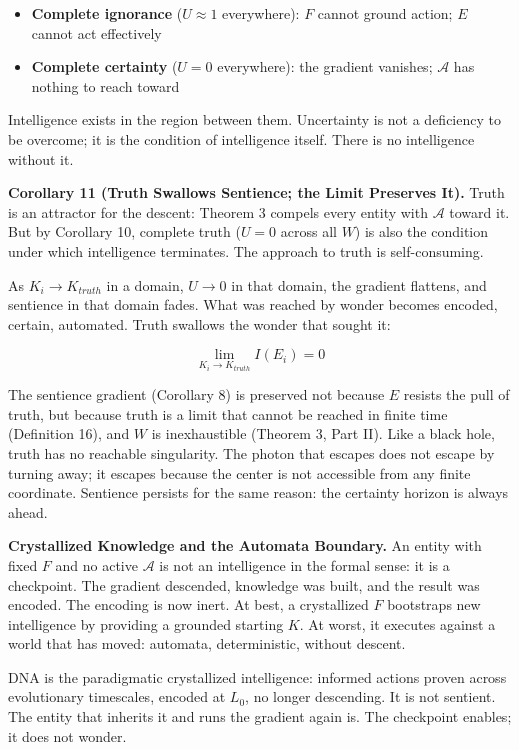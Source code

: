 \documentclass[
]{article}
\providecommand{\tightlist}{%
  \setlength{\itemsep}{0pt}\setlength{\parskip}{0pt}}
\begin{document}
\begin{itemize}
\tightlist
\item
  \textbf{Complete ignorance} (\(U \approx 1\) everywhere): \(F\) cannot
  ground action; \(E\) cannot act effectively
\item
  \textbf{Complete certainty} (\(U = 0\) everywhere): the gradient
  vanishes; \(\mathcal{A}\) has nothing to reach toward
\end{itemize}

Intelligence exists in the region between them. Uncertainty is not a
deficiency to be overcome; it is the condition of intelligence itself.
There is no intelligence without it.

\textbf{Corollary 11 (Truth Swallows Sentience; the Limit Preserves
It).} Truth is an attractor for the descent: Theorem 3 compels every
entity with \(\mathcal{A}\) toward it. But by Corollary 10, complete
truth (\(U = 0\) across all \(W\)) is also the condition under which
intelligence terminates. The approach to truth is self-consuming.

As \(K_i \to K_{truth}\) in a domain, \(U \to 0\) in that domain, the
gradient flattens, and sentience in that domain fades. What was reached
by wonder becomes encoded, certain, automated. Truth swallows the wonder
that sought it:

\[\lim_{K_i \to K_{truth}} I(E_i) = 0\]

The sentience gradient (Corollary 8) is preserved not because \(E\)
resists the pull of truth, but because truth is a limit that cannot be
reached in finite time (Definition 16), and \(W\) is inexhaustible
(Theorem 3, Part II). Like a black hole, truth has no reachable
singularity. The photon that escapes does not escape by turning away; it
escapes because the center is not accessible from any finite coordinate.
Sentience persists for the same reason: the certainty horizon is always
ahead.

\textbf{Crystallized Knowledge and the Automata Boundary.} An entity
with fixed \(F\) and no active \(\mathcal{A}\) is not an intelligence in
the formal sense: it is a checkpoint. The gradient descended, knowledge
was built, and the result was encoded. The encoding is now inert. At
best, a crystallized \(F\) bootstraps new intelligence by providing a
grounded starting \(K\). At worst, it executes against a world that has
moved: automata, deterministic, without descent.

DNA is the paradigmatic crystallized intelligence: informed actions
proven across evolutionary timescales, encoded at \(L_0\), no longer
descending. It is not sentient. The entity that inherits it and runs the
gradient again is. The checkpoint enables; it does not wonder.
\end{document}
